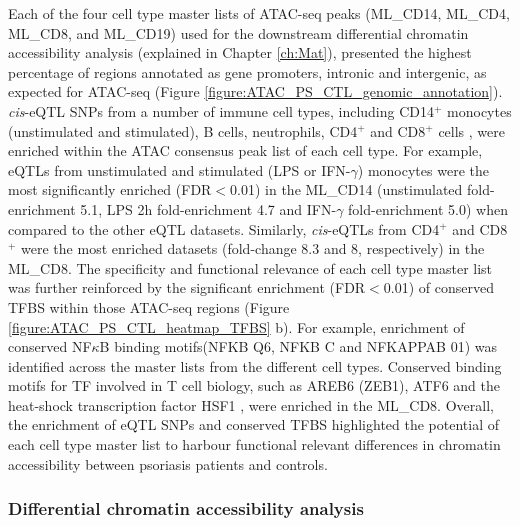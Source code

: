 Each of the four cell type master lists of ATAC-seq peaks (ML\_CD14, ML\_CD4, ML\_CD8, and ML\_CD19) used for the downstream differential chromatin accessibility analysis (explained in Chapter \ref{ch:Mat}), presented the highest percentage of regions annotated as gene promoters, intronic and intergenic, as expected for ATAC-seq (Figure \ref{figure:ATAC_PS_CTL_genomic_annotation}). \textit{cis}-eQTL SNPs from a number of immune cell types, including CD14$^+$ monocytes (unstimulated and stimulated), B cells, neutrophils, CD4$^+$ and CD8$^+$ cells \parencite{Fairfax2012, Fairfax2014, Kasela2016}, were enriched within the ATAC consensus peak list of each cell type. For example, eQTLs from unstimulated and stimulated (LPS or IFN-$\gamma$) monocytes were the most significantly enriched (FDR$<$0.01) in the ML\_CD14 (unstimulated fold-enrichment 5.1, LPS 2h fold-enrichment 4.7 and IFN-$\gamma$ fold-enrichment 5.0) when compared to the other eQTL datasets. Similarly, \textit{cis}-eQTLs from CD4$^+$ and CD8$^+$ were the most enriched datasets (fold-change 8.3 and 8, respectively) in the ML\_CD8. The specificity and functional relevance of each cell type master list was further reinforced by the significant enrichment (FDR$<$0.01) of conserved TFBS within those ATAC-seq regions (Figure \ref{figure:ATAC_PS_CTL_heatmap_TFBS} b). For example, enrichment of conserved NF$\kappa$B binding motifs(NFKB Q6, NFKB C and NFKAPPAB 01) was identified across the master lists from the different cell types. Conserved binding motifs for TF involved in T cell biology, such as AREB6 (ZEB1), ATF6 and the heat-shock transcription factor HSF1 \parencite{Guan2018,Yamazaki2009,Gandhapudi2013}, were enriched in the ML\_CD8. 
Overall, the enrichment of eQTL SNPs and conserved TFBS highlighted the potential of each cell type master list to harbour functional relevant differences in chromatin accessibility between psoriasis patients and controls.



\subsubsection{Differential chromatin accessibility analysis}

